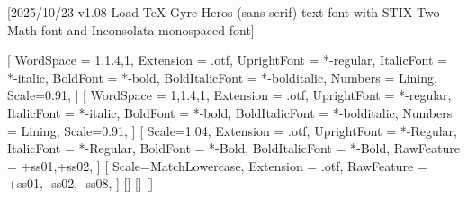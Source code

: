 
[2025/10/23 v1.08 Load TeX Gyre Heros (sans serif) text font with STIX Two Math font and Inconsolata monospaced font]

%
%
\ifpdftex
	\RequirePackage[T1]{fontenc}
	\RequirePackage{bm}
\else
    \RequirePackage[warnings-off={mathtools-colon,mathtools-overbracket},mathbf=sym]{unicode-math}

    \setmainfont{texgyreheros}[
		WordSpace = {1,1.4,1},
		Extension = .otf,
    	UprightFont = *-regular,
    	ItalicFont = *-italic,
    	BoldFont = *-bold,
    	BoldItalicFont = *-bolditalic,
		Numbers = Lining,
    	Scale=0.91,
	]        
    \setsansfont{texgyreheros}[
		WordSpace = {1,1.4,1},
		Extension = .otf,
    	UprightFont = *-regular,
    	ItalicFont = *-italic,
    	BoldFont = *-bold,
    	BoldItalicFont = *-bolditalic,
		Numbers = Lining,
    	Scale=0.91,
	]        
   \setmonofont{Inconsolatazi4}[
        Scale=1.04,
        Extension = .otf,
        UprightFont = *-Regular,
        ItalicFont = *-Regular,%
        BoldFont = *-Bold, 
    	BoldItalicFont = *-Bold,%
        RawFeature = {+ss01,+ss02}, %
    ]             
    [%
    	Scale=MatchLowercase,%
    	Extension = .otf,
    	RawFeature = {+ss01, -ss02, -ss08},
    ]
    \setmathfontface{}[]%
    \setmathfontface{}[]
    \setmathfontface{}[]%
    \newcommand*{\FRAC}[1]{{\addfontfeature{Fractions=On}#1}}%
\fi